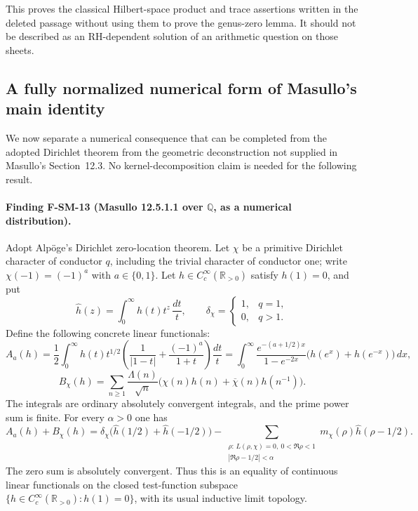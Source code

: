 This proves the classical Hilbert-space product and trace assertions
written in the deleted passage without using them to prove the
genus-zero lemma.  It should not be described as an RH-dependent solution
of an arithmetic question on those sheets.

\subsection{A fully normalized numerical form of Masullo's main identity}

We now separate a numerical consequence that can be completed from the
adopted Dirichlet theorem from the geometric deconstruction not supplied
in Masullo's Section~12.3.  No kernel-decomposition claim is needed for
the following result.

\paragraph{Finding F-SM-13 (Masullo 12.5.1.1 over $\mathbb Q$, as a numerical distribution).}
Adopt Alp\"oge's Dirichlet zero-location theorem.  Let $\chi$ be a
primitive Dirichlet character of conductor $q$, including the trivial
character of conductor one; write $\chi(-1)=(-1)^a$ with $a\in\{0,1\}$.
Let $h\in C_c^\infty(\mathbb R_{>0})$ satisfy $h(1)=0$, and put
\[
 \widehat h(z)=\int_0^\infty h(t)t^z\,\frac{dt}{t},
 \qquad\delta_\chi=\begin{cases}1,&q=1,\\0,&q>1.\end{cases}
\]
Define the following concrete linear functionals:
\[
 A_a(h)=\frac12\int_0^\infty h(t)t^{1/2}
 \left(\frac1{|1-t|}+\frac{(-1)^a}{1+t}\right)\frac{dt}{t}
 =\int_0^\infty
 \frac{e^{-(a+1/2)x}}{1-e^{-2x}}
 \bigl(h(e^x)+h(e^{-x})\bigr)\,dx,
\]
\[
 B_\chi(h)=\sum_{n\geq1}\frac{\Lambda(n)}{\sqrt n}
 \bigl(\chi(n)h(n)+\overline\chi(n)h(n^{-1})\bigr).
\]
The integrals are ordinary absolutely convergent integrals, and the prime
power sum is finite.  For every $\alpha>0$ one has
\begin{equation}\label{eq:SM-numeric-strip}
 A_a(h)+B_\chi(h)
 =\delta_\chi\bigl(\widehat h(1/2)+\widehat h(-1/2)\bigr)
 -\!\sum_{\substack{\rho:\,L(\rho,\chi)=0,\ 0<\Re\rho<1\\
                         |\Re\rho-1/2|<\alpha}}
       m_\chi(\rho)\widehat h(\rho-1/2).
\end{equation}
The zero sum is absolutely convergent.  Thus this is an equality of
continuous linear functionals on the closed test-function subspace
$\{h\in C_c^\infty(\mathbb R_{>0}):h(1)=0\}$, with its usual inductive
limit topology.

